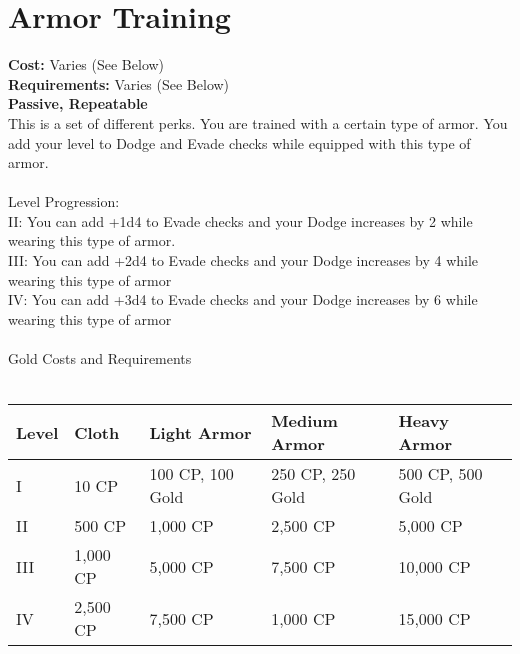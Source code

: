 \section{Armor Training}
\textbf{Cost:} Varies (See Below)\\
\textbf{Requirements:} Varies (See Below)\\
\textbf{Passive, Repeatable}\\
This is a set of different perks. You are trained with a certain type of armor. You add your level to Dodge and Evade checks while equipped with this type of armor.\\
\\
Level Progression:\\
II: You can add +1d4 to Evade checks and your Dodge increases by 2 while wearing this type of armor.\\
III: You can add +2d4 to Evade checks and your Dodge increases by 4 while wearing this type of armor\\
IV: You can add +3d4 to Evade checks and your Dodge increases by 6 while wearing this type of armor\\
\\
Gold Costs and Requirements\\
\\
\begin{tabular}{l | p{2cm} | p{2.4cm} | p{2.6cm} | p{2.6cm}}
	Level & Cloth & Light Armor & Medium Armor & Heavy Armor\\ \hline
	I & 10 CP & 100 CP, 100 Gold & 250 CP, 250 Gold & 500 CP, 500 Gold\\
	II & 500 CP& 1,000 CP & 2,500 CP & 5,000 CP\\
	III & 1,000 CP& 5,000 CP & 7,500 CP & 10,000 CP\\
	IV & 2,500 CP& 7,500 CP & 1,000 CP & 15,000 CP\\
\end{tabular}